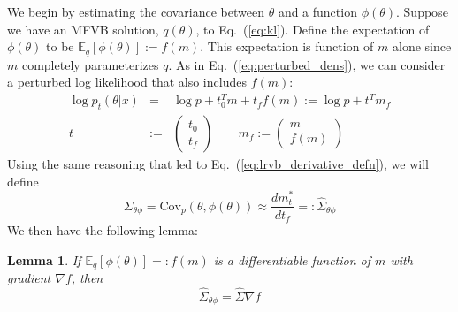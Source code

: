 \documentclass{article}\usepackage[]{graphicx}\usepackage[]{color}
\newcommand{\eq}[1]{Eq.~(\ref{eq:#1})}
\newcommand{\truecov}{\Sigma} %
\newcommand{\lrcov}{\hat{\Sigma}} %
\theoremstyle{plain}
\newtheorem{lemma}[theorem]{Lemma}
\newcommand{\mbeq}{\mathbb{E}_{q}}
\newcommand{\cov}{\textrm{Cov}}
\begin{document}
We begin by estimating the covariance between $\theta$ and a function
$\phi(\theta)$. Suppose we have an MFVB solution, $q(\theta)$, to \eq{kl}.
Define the expectation of $\phi(\theta)$ to be $\mbeq\left[\phi(\theta)\right] :=
f(m)$.  This expectation is function of $m$ alone since $m$ completely
parameterizes $q$. As in \eq{perturbed_dens}, we can consider a perturbed log
likelihood that also includes $f\left(m\right)$:
%
\begin{eqnarray*}
  \log p_{t}\left(\theta\vert x \right) & = &
    \log p+t_{0}^{T}m+t_{f}f\left(m\right):=\log p+t^{T}m_{f}\\
  t & := & \left(\begin{array}{c}
  t_{0}\\
  t_{f}
  \end{array}\right) \quad \quad
  m_{f} := \left(\begin{array}{c}
  m\\
  f\left(m\right)
  \end{array}\right)
\end{eqnarray*}
%
Using the same reasoning that led to \eq{lrvb_derivative_defn}, we will define
%
$$
\truecov_{\theta \phi} = \cov_p(\theta, \phi(\theta))
  \approx \frac{dm_t^{*}}{dt_f} =: \lrcov_{\theta\phi}
$$
%
We then have the following lemma:
%
\begin{lemma} \label{lem:theta_function_covariance}
  If $\mbeq\left[\phi(\theta)\right] =: f(m)$ is a differentiable function of $m$
  with gradient $\nabla f$, then
  $$
  \lrcov_{\theta\phi} = \lrcov \nabla f
  $$
\end{lemma}
\end{document}
